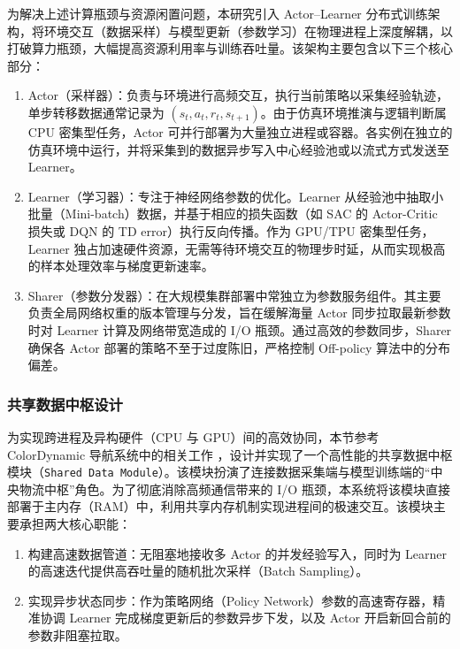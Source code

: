 \documentclass[
  oneside,
  degree=bachelor,
  fullwidthstop=false,
  fontset=fandol,
  times=false,
  minted=true,
  biblatex=true,
]{tongjithesis}
\begin{document}
为解决上述计算瓶颈与资源闲置问题，本研究引入 Actor–Learner 分布式训练架构，将环境交互（数据采样）与模型更新（参数学习）在物理进程上深度解耦，以打破算力瓶颈，大幅提高资源利用率与训练吞吐量。该架构主要包含以下三个核心部分：

\begin{enumerate}
\item Actor（采样器）：负责与环境进行高频交互，执行当前策略以采集经验轨迹，单步转移数据通常记录为 $(s_t, a_t, r_t, s_{t+1})$。由于仿真环境推演与逻辑判断属 CPU 密集型任务，Actor 可并行部署为大量独立进程或容器。各实例在独立的仿真环境中运行，并将采集到的数据异步写入中心经验池或以流式方式发送至 Learner。

\item Learner（学习器）：专注于神经网络参数的优化。Learner 从经验池中抽取小批量（Mini-batch）数据，并基于相应的损失函数（如 SAC 的 Actor-Critic 损失或 DQN 的 TD error）执行反向传播。作为 GPU/TPU 密集型任务，Learner 独占加速硬件资源，无需等待环境交互的物理步时延，从而实现极高的样本处理效率与梯度更新速率。

\item Sharer（参数分发器）：在大规模集群部署中常独立为参数服务组件。其主要负责全局网络权重的版本管理与分发，旨在缓解海量 Actor 同步拉取最新参数时对 Learner 计算及网络带宽造成的 I/O 瓶颈。通过高效的参数同步，Sharer 确保各 Actor 部署的策略不至于过度陈旧，严格控制 Off-policy 算法中的分布偏差。
\end{enumerate}

\subsubsection{共享数据中枢设计}
为实现跨进程及异构硬件（CPU 与 GPU）间的高效协同，本节参考 ColorDynamic 导航系统中的相关工作 \cite{colordynamic}，设计并实现了一个高性能的共享数据中枢模块（\texttt{Shared Data Module}）。该模块扮演了连接数据采集端与模型训练端的“中央物流中枢”角色。为了彻底消除高频通信带来的 I/O 瓶颈，本系统将该模块直接部署于主内存（RAM）中，利用共享内存机制实现进程间的极速交互。该模块主要承担两大核心职能：
\begin{enumerate}
    \item 构建高速数据管道：无阻塞地接收多 Actor 的并发经验写入，同时为 Learner 的高速迭代提供高吞吐量的随机批次采样（Batch Sampling）。
    \item 实现异步状态同步：作为策略网络（Policy Network）参数的高速寄存器，精准协调 Learner 完成梯度更新后的参数异步下发，以及 Actor 开启新回合前的参数非阻塞拉取。
\end{enumerate}
\end{document}

